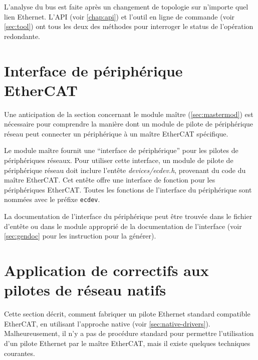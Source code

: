 \documentclass[a4paper,12pt,BCOR=6mm,bibtotoc,idxtotoc]{scrbook}
\begin{document}
L'analyse du bus est faite apr\`es un changement de topologie sur
n'importe quel lien Ethernet. L'API (voir \autoref{chap:api}) et
l'outil en ligne de commande (voir \autoref{sec:tool}) ont tous les
deux des m\'ethodes pour interroger le status de l'op\'eration redondante.


\section{Interface de p\'eriph\'erique EtherCAT}
\label{sec:ecdev}

Une anticipation de la section concernant le module ma\^itre
(\autoref{sec:mastermod}) est n\'ecessaire pour comprendre la
mani\`ere dont un module de pilote de p\'eriph\'erique r\'eseau peut
connecter un p\'eriph\'erique \`a un ma\^itre EtherCAT sp\'ecifique.

Le module ma\^itre fournit une ``interface de p\'eriph\'erique'' pour
les pilotes de p\'eriph\'eriques r\'eseaux.  Pour utiliser cette
interface, un module de pilote de p\'eriph\'erique r\'eseau doit
inclure l'ent\^ete
\textit{devices/ecdev.h},
provenant du code du ma\^itre EtherCAT. Cet ent\^ete offre une
interface de fonction pour les p\'eriph\'eriques EtherCAT. Toutes les
fonctions de l'interface du p\'eriph\'erique sont nomm\'ees avec le
pr\'efixe \lstinline+ecdev+.

La documentation de l'interface du p\'eriph\'erique peut \^etre
trouv\'ee dans le fichier d'ent\^ete ou dans le module appropri\'e de
la documentation de l'interface (voir \autoref{sec:gendoc} pour les
instruction pour la g\'en\'erer).



\section{Application de correctifs aux pilotes de r\'eseau natifs}
\label{sec:patching}

Cette section d\'ecrit, comment fabriquer un pilote Ethernet standard
compatible EtherCAT, en utilisant l'approche native (voir
\autoref{sec:native-drivers}).  Malheureusement, il n'y a pas de
proc\'edure standard pour permettre l'utilisation d'un pilote Ethernet
par le ma\^itre EtherCAT, mais il existe quelques techniques
courantes.
\end{document}
